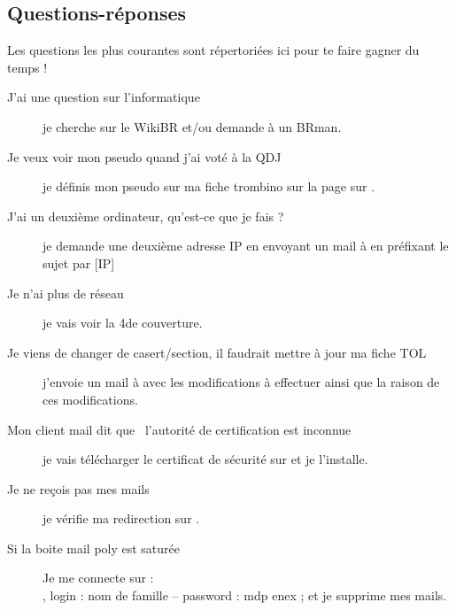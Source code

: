 
\subsection{Questions-réponses}

Les questions les plus courantes sont répertoriées ici pour te faire gagner du temps !

\begin{description}

\item[J'ai une question sur l'informatique] je cherche sur le WikiBR et/ou demande \`a un BRman.


\item[Je veux voir mon pseudo quand j'ai voté à la QDJ] je définis mon pseudo sur ma fiche \linebreak trombino sur la page  sur \fkz.

\item[J'ai un deuxième ordinateur, qu'est-ce que je fais ?] je demande une deuxième adresse IP en envoyant un mail à  en préfixant le sujet par [IP] 

\item[Je n'ai plus de réseau] je vais voir la 4\ieme de couverture.

\item[Je viens de changer de casert/section, il faudrait mettre à jour ma fiche TOL] j'envoie \linebreak un mail à  avec les modifications à effectuer ainsi que la raison de ces
modifications.

\item[Mon client mail dit que \guillemotleft~l'autorité de certification est inconnue~\guillemotright ] je vais télécharger le certificat de sécurité sur  et je l'installe.

\item[Je ne reçois pas mes mails] je vérifie ma redirection sur .

\item[Si la boite mail poly est saturée] Je me connecte sur :\\
, 
login : nom de famille --
password : mdp enex ; et je supprime mes mails.



\end{description}
